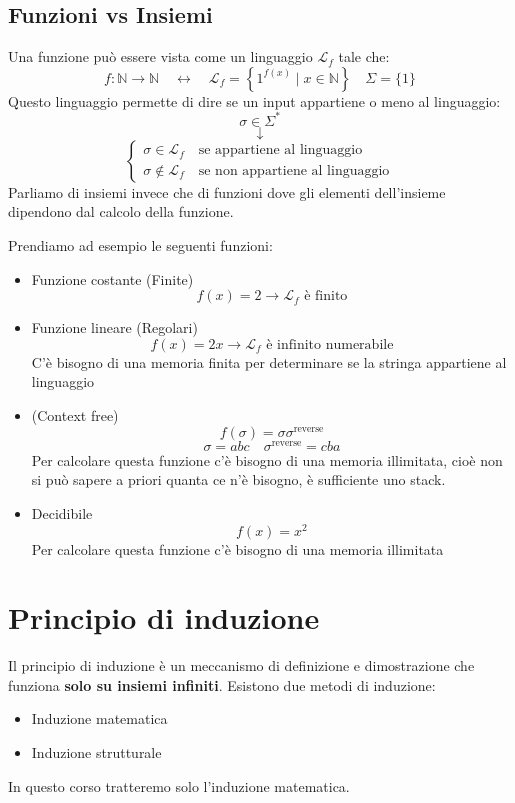 \documentclass[a4paper]{article}
\begin{document}
\subsection{Funzioni vs Insiemi}
Una funzione può essere vista come un linguaggio \( \mathcal{L}_f \) tale che:
\[
  f: \mathbb{N} \to \mathbb{N} \quad \leftrightarrow \quad
  \mathcal{L}_f = \left\{ 1^{f(x)} \;\left|\; x \in \mathbb{N} \right.\right\} \quad
  \Sigma = \{1\}
\] 
Questo linguaggio permette di dire se un input appartiene o meno al linguaggio:
\[
  \sigma  \in \Sigma^*
\] 
\[
  \downarrow
\] 
\[
  \begin{cases}
    \sigma  \in \mathcal{L}_f \quad \text{se appartiene al linguaggio}\\
    \sigma  \notin \mathcal{L}_f \quad \text{se non appartiene al linguaggio}
  \end{cases}
\] 
Parliamo di insiemi invece che di funzioni dove gli elementi dell'insieme dipendono dal
calcolo della funzione.
\begin{example}
  Prendiamo ad esempio le seguenti funzioni:
  \begin{itemize}
    \item Funzione costante (Finite)
      \[
        f(x) = 2 \to \mathcal{L}_f \text{ è finito}
      \] 
    \item Funzione lineare (Regolari)
      \[
        f(x) = 2x \to \mathcal{L}_f \text{ è infinito numerabile}
      \]
      C'è bisogno di una memoria finita per determinare se la stringa appartiene al linguaggio
    \item (Context free)
      \[
        f(\sigma) = \sigma \sigma^{\text{reverse}}
      \] 
      \[
        \sigma = abc \quad \sigma^\text{reverse} = cba
      \] 
      Per calcolare questa funzione c'è bisogno di una memoria illimitata, cioè non
      si può sapere a priori quanta ce n'è bisogno, è sufficiente uno stack.

    \item Decidibile
      \[
        f(x) = x^2
      \] 
      Per calcolare questa funzione c'è bisogno di una memoria illimitata
  \end{itemize}
\end{example}

\label{13-10-D1}

\section{Principio di induzione}
Il principio di induzione è un meccanismo di definizione e dimostrazione che funziona
\textbf{solo su insiemi infiniti}. Esistono due metodi di induzione:
\begin{itemize}
  \item Induzione matematica
  \item Induzione strutturale
\end{itemize}
In questo corso tratteremo solo l'induzione matematica.
\end{document}
